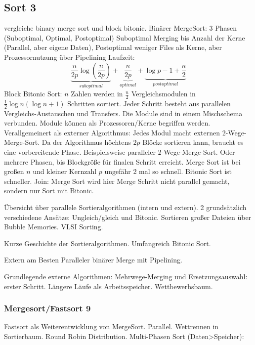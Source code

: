 \documentclass[a4paper,12pt,twoside]{article}
\begin{document}
\subsection{Sort 3}
\textbf{}

vergleiche binary merge sort und block bitonic.
Binärer MergeSort: 3 Phasen (Suboptimal, Optimal, Postoptimal)
Suboptimal Merging bis Anzahl der Kerne (Parallel, aber eigene Daten), Postoptimal weniger Files als Kerne, aber Prozessornutzung über Pipelining
Laufzeit:
\[ \underbrace{\frac{n}{2p} \log \left( \frac{n}{2p} \right)}_{suboptimal} + \underbrace{\frac{n}{2p}}_{optimal} + \underbrace{\log p - 1 + \frac{n}{2}}_{postoptimal} \]
Block Bitonic Sort: $n$ Zahlen werden in $\frac{n}{2}$ Vergleichsmodulen in $\frac{1}{2} \log n (\log n +1)$ Schritten sortiert. Jeder Schritt besteht aus parallelen Vergleichs-Austauschen und Transfers. Die  Module sind in einem Mischschema verbunden. Module können als Prozessoren/Kerne begriffen werden. Verallgemeinert als externer Algorithmus: Jedes Modul macht externen 2-Wege-Merge-Sort. Da der Algorithmus höchtens $2p$ Blöcke sortieren kann, braucht es eine vorbereitende Phase. Beispielsweise paralleler 2-Wege-Merge-Sort. Oder mehrere Phasen, bis Blockgröße für finalen Schritt erreicht. Merge Sort ist bei großen $n$ und kleiner Kernzahl $p$ ungefähr 2 mal so schnell. Bitonic Sort ist schneller.
Join: Merge Sort wird hier Merge Schritt nicht parallel gemacht, sondern nur Sort mit Bitonic. 

\textbf{}

Übersicht über parallele Sortieralgorithmen (intern und extern). 2 grundsätzlich verschiedene Ansätze: Ungleich/gleich und Bitonic. Sortieren großer Dateien über Bubble Memories. VLSI Sorting.

Kurze Geschichte der Sortieralgorithmen. Umfangreich Bitonic Sort. 

Extern am Besten Paralleler binärer Merge mit Pipelining. 

\textbf{}

Grundlegende externe Algorithmen: Mehrwege-Merging und Ersetzungsauswahl: erster Schritt. Längere Läufe als Arbeitsspeicher. Wettbewerbsbaum. 

\subsubsection{Mergesort/Fastsort 9}
\textbf{}

Fastsort als Weiterentwicklung von MergeSort. Parallel.
Wettrennen in Sortierbaum. Round Robin Distribution.
Multi-Phasen Sort (Daten>Speicher): 
\end{document}
